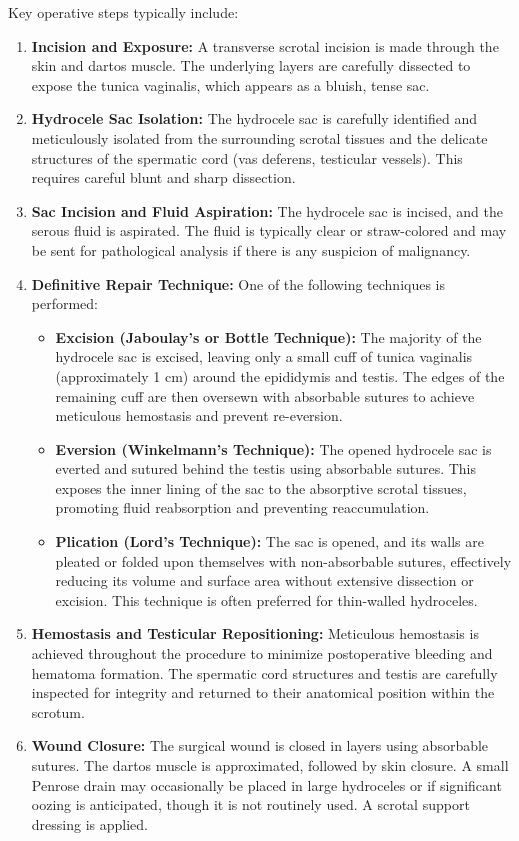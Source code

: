 Key operative steps typically include:
\begin{enumerate}
  \item \textbf{Incision and Exposure:} A transverse scrotal incision is made through the skin and dartos muscle. The underlying layers are carefully dissected to expose the tunica vaginalis, which appears as a bluish, tense sac.
  \item \textbf{Hydrocele Sac Isolation:} The hydrocele sac is carefully identified and meticulously isolated from the surrounding scrotal tissues and the delicate structures of the spermatic cord (vas deferens, testicular vessels). This requires careful blunt and sharp dissection.
  \item \textbf{Sac Incision and Fluid Aspiration:} The hydrocele sac is incised, and the serous fluid is aspirated. The fluid is typically clear or straw-colored and may be sent for pathological analysis if there is any suspicion of malignancy.
  \item \textbf{Definitive Repair Technique:} One of the following techniques is performed:
    \begin{itemize}
      \item \textbf{Excision (Jaboulay's or Bottle Technique):} The majority of the hydrocele sac is excised, leaving only a small cuff of tunica vaginalis (approximately 1 cm) around the epididymis and testis. The edges of the remaining cuff are then oversewn with absorbable sutures to achieve meticulous hemostasis and prevent re-eversion.
      \item \textbf{Eversion (Winkelmann's Technique):} The opened hydrocele sac is everted and sutured behind the testis using absorbable sutures. This exposes the inner lining of the sac to the absorptive scrotal tissues, promoting fluid reabsorption and preventing reaccumulation.
      \item \textbf{Plication (Lord's Technique):} The sac is opened, and its walls are pleated or folded upon themselves with non-absorbable sutures, effectively reducing its volume and surface area without extensive dissection or excision. This technique is often preferred for thin-walled hydroceles.
    \end{itemize}
  \item \textbf{Hemostasis and Testicular Repositioning:} Meticulous hemostasis is achieved throughout the procedure to minimize postoperative bleeding and hematoma formation. The spermatic cord structures and testis are carefully inspected for integrity and returned to their anatomical position within the scrotum.
  \item \textbf{Wound Closure:} The surgical wound is closed in layers using absorbable sutures. The dartos muscle is approximated, followed by skin closure. A small Penrose drain may occasionally be placed in large hydroceles or if significant oozing is anticipated, though it is not routinely used. A scrotal support dressing is applied.
\end{enumerate}

